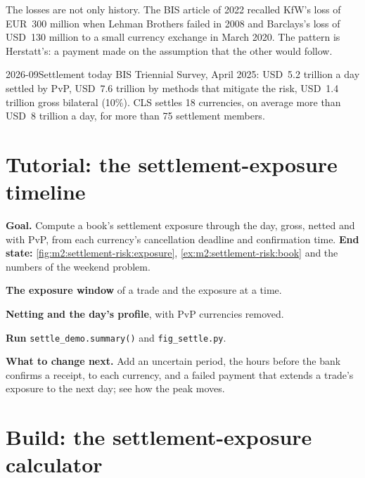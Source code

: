 The losses are not only history. The BIS article of 2022 recalled KfW's loss of
EUR~300 million when Lehman Brothers failed in 2008 and Barclays's loss of USD~130
million to a small currency exchange in March 2020. The pattern is Herstatt's: a
payment made on the assumption that the other would follow.

\begin{dated}{2026-09}{Settlement today}\label{dat:m2:settlement-risk:today}
BIS Triennial Survey, April 2025: USD~5.2 trillion a day settled by PvP, USD~7.6
trillion by methods that mitigate the risk, USD~1.4 trillion gross bilateral (10\%).
CLS settles 18 currencies, on average more than USD~8 trillion a day, for more than
75 settlement members.
\end{dated}

\section{Tutorial: the settlement-exposure timeline}\label{tut:m2:settlement-risk:timeline}

\begin{tutorial}
\textbf{Goal.} Compute a book's settlement exposure through the day, gross, netted
and with PvP, from each currency's cancellation deadline and confirmation time.
\textbf{End state:} \cref{fig:m2:settlement-risk:exposure},
\cref{ex:m2:settlement-risk:book} and the numbers of the weekend problem.
\begin{tutsteps}
\item \textbf{The exposure window} of a trade and the exposure at a time.
\label{lst:m2:settlement-risk:window}
\item \textbf{Netting and the day's profile}, with PvP currencies removed.
\label{lst:m2:settlement-risk:profile}
\item \textbf{Run} \texttt{settle\_demo.summary()} and \texttt{fig\_settle.py}.
\end{tutsteps}
\textbf{What to change next.} Add an uncertain period, the hours before the bank
confirms a receipt, to each currency, and a failed payment that extends a trade's
exposure to the next day; see how the peak moves.
\end{tutorial}

\section{Build: the settlement-exposure calculator}\label{bld:m2:settlement-risk:settlerisk}

